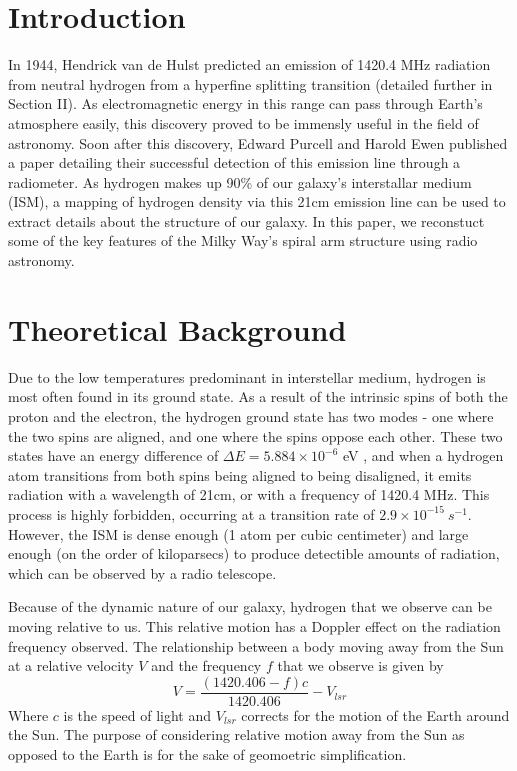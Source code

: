 \section{Introduction}
In 1944, Hendrick van de Hulst predicted an emission of 1420.4 MHz radiation from neutral hydrogen from a hyperfine splitting transition (detailed further in Section II). As electromagnetic energy in this range can pass through Earth's atmosphere easily, this discovery proved to be immensly useful in the field of astronomy. Soon after this discovery, Edward Purcell and Harold Ewen published a paper detailing their successful detection of this emission line through a radiometer. As hydrogen makes up 90\% of our galaxy's interstallar medium (ISM), a mapping of hydrogen density via this 21cm emission line can be used to extract details about the structure of our galaxy. In this paper, we reconstuct some of the key features of the Milky Way's spiral arm structure using radio astronomy.

\section{Theoretical Background}
Due to the low temperatures predominant in interstellar medium, hydrogen is most often found in its ground state. As a result of the intrinsic spins of both the proton and the electron, the hydrogen ground state has two modes - one where the two spins are aligned, and one where the spins oppose each other. These two states have an energy difference of $\Delta E = 5.884 \times 10^{-6}$ eV \cite{griffiths}, and when a hydrogen atom transitions from both spins being aligned to being disaligned, it emits radiation with a wavelength of 21cm, or with a frequency of 1420.4 MHz. This process is highly forbidden, occurring at a transition rate of $2.9 \times 10^{-15}\ s^{-1}$. However, the ISM is dense enough (1 atom per cubic centimeter) and large enough (on the order of kiloparsecs) to produce detectible amounts of radiation, which can be observed by a radio telescope. 

Because of the dynamic nature of our galaxy, hydrogen that we observe can be moving relative to us. This relative motion has a Doppler effect on the radiation frequency observed. The relationship between a body moving away from the Sun at a relative velocity $V$ and the frequency $f$ that we observe is given by
\begin{equation}
  V = \frac{(1420.406 - f)c}{1420.406} - V_{lsr}
\end{equation}
Where $c$ is the speed of light and $V_{lsr}$ corrects for the motion of the Earth around the Sun. The purpose of considering relative motion away from the Sun as opposed to the Earth is for the sake of geomoetric simplification.

